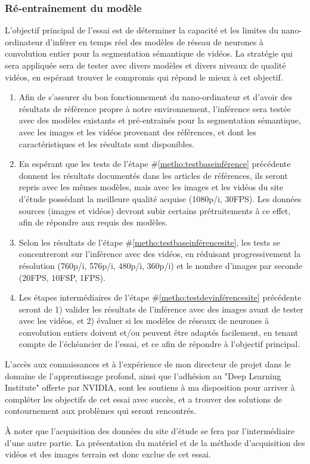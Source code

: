\subsubsection{Ré-entrainement du modèle}

\par L'objectif principal de l'essai est de déterminer la capacité et les limites du nano-ordinateur d'inférer en temps réel des modèles de réseau de neurones à convolution entier pour la segmentation sémantique de vidéos. La stratégie qui sera appliquée sera de tester avec divers modèles et divers niveaux de qualité vidéos, en espérant trouver le compromis qui répond le mieux à cet objectif.
\begin{enumerate}
   \item \label{metho:testbaseinférence} Afin de s'assurer du bon fonctionnement du nano-ordinateur et d'avoir des résultats de référence propre à notre environnement, l'inférence sera testée avec des modèles existants et pré-entrainés pour la segmentation sémantique, avec les images et les vidéos provenant des références, et dont les caractéristiques et les résultats sont disponibles. 
   \item \label{metho:testbaseinférencesite} En espérant que les tests de l'étape \#\ref{metho:testbaseinférence} précédente donnent les résultats documentés dans les articles de références, ils seront repris avec les mêmes modèles, mais avec les images et les vidéos du site d'étude possédant la meilleure qualité acquise (1080p/i, 30FPS). Les données sources (images et vidéos) devront subir certains prétraitements à ce effet, afin de répondre aux requis des modèles.
   \item \label{metho:testdevinférencesite} Selon les résultats de l'étape \#\ref{metho:testbaseinférencesite}, les tests se concentreront sur l'inférence avec des vidéos, en réduisant progressivement la résolution (760p/i, 576p/i, 480p/i, 360p/i) et le nombre d'images par seconde (20FPS, 10FSP, 1FPS).
   \item Les étapes intermédiaires de l'étape \#\ref{metho:testdevinférencesite} précédente seront de 1) valider les résultats de l'inférence avec des images avant de tester avec les vidéos, et 2) évaluer si les modèles de réseaux de neurones à convolution entiers doivent et/ou peuvent être adaptés facilement, en tenant compte de l'échéancier de l'essai, et ce afin de répondre à l'objectif principal.
\end{enumerate}
\par L'accès aux connaissances et à l'expérience de mon directeur de projet dans le domaine de l'apprentissage profond, ainsi que l'adhésion au "Deep Learning Institute" offerte par NVIDIA, sont les soutiens à ma disposition  pour arriver à compléter les objectifs de cet essai avec succès, et a trouver des solutions de contournement aux problèmes qui seront rencontrés.
\par À noter que l'acquisition des données du site d'étude se fera par l'intermédiaire d'une autre partie. La présentation du matériel et de la méthode d'acquisition des vidéos et des images terrain est donc exclue de cet essai.